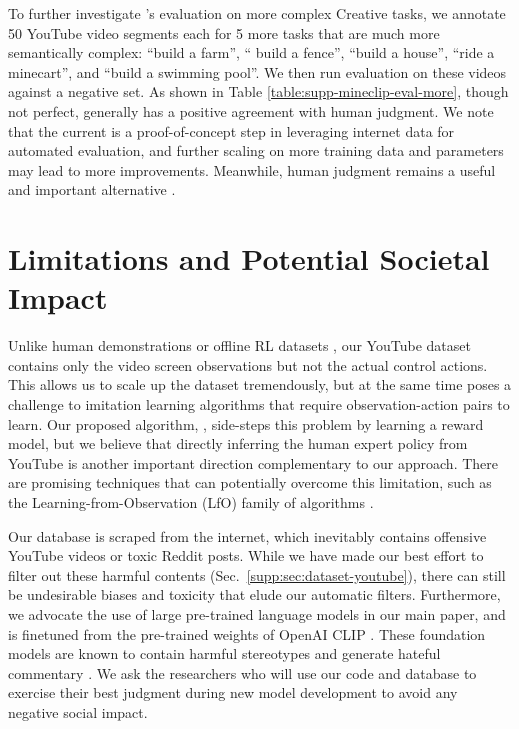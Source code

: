 To further investigate \mineclip{}'s evaluation on more complex Creative tasks,
we annotate 50 YouTube video segments each for 5 more tasks that are much more semantically complex: ``build a farm'', `` build a fence'', ``build a house'', ``ride a minecart'', and ``build a swimming pool''. We then run \mineclip evaluation on these videos against a negative set. As shown in Table \ref{table:supp-mineclip-eval-more}, though not perfect, \mineclip generally has a positive agreement with human judgment. We note that the current \mineclip is a proof-of-concept step in leveraging internet data for automated evaluation, and further scaling on more training data and parameters may lead to more improvements. Meanwhile, human judgment remains a useful and important alternative \cite{openai2022dalle2,saharia2022imagen}.



\section{Limitations and Potential Societal Impact}

Unlike human demonstrations \cite{vinyals2019alphastar} or offline RL datasets \cite{fu2020d4rl}, our YouTube dataset contains only the video screen observations but not the actual control actions. This allows us to scale up the dataset tremendously, but at the same time poses a challenge to imitation learning algorithms that require observation-action pairs to learn. 
Our proposed algorithm, \mineclip, side-steps this problem by learning a reward model, but we believe that directly inferring the human expert policy from YouTube is another important direction complementary to our approach. There are promising techniques that can potentially overcome this limitation, such as the Learning-from-Observation (LfO) family of algorithms \cite{torabi2019lfosurvey,torabi2018behavioral,stadie2017thirdperson,edwards2018imitatinglatent}. 

Our database is scraped from the internet, which inevitably contains offensive YouTube videos or toxic Reddit posts. While we have made our best effort to filter out these harmful contents (Sec.~\ref{supp:sec:dataset-youtube}), there can still be undesirable biases and toxicity that elude our automatic filters. Furthermore, we advocate the use of large pre-trained language models in our main paper, and \mineclip is finetuned from the pre-trained weights of OpenAI CLIP \cite{radford2021clip}. These foundation models are known to contain harmful stereotypes and generate hateful commentary \cite{brown2020gpt3,bommasani2021foundation,gehman2020realtoxicityprompts}. We ask the researchers who will use our code and database to exercise their best judgment during new model development to avoid any negative social impact.   
